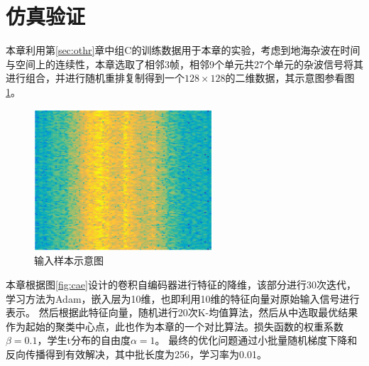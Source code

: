 \section{仿真验证}
\label{sec:decc_experiment}
本章利用第\ref{sec:othr}章中组C的训练数据用于本章的实验，考虑到地海杂波在时间与空间上的连续性，本章选取了相邻3帧，相邻9个单元共27个单元的杂波信号将其进行组合，并进行随机重排复制得到一个$128\times 128$的二维数据，其示意图参看图 \ref{fig:unsurpvised_data}。
\begin{figure}[hbt]
	\centering
	\includegraphics[width=6.67cm]{figures/AE/unsurpvised_data}
	\caption{输入样本示意图}
	\label{fig:unsurpvised_data}
\end{figure}

本章根据图\ref{fig:cae}设计的卷积自编码器进行特征的降维，该部分进行30次迭代，学习方法为Adam，嵌入层为10维，也即利用10维的特征向量对原始输入信号进行表示。
然后根据此特征向量，随机进行20次K-均值算法，然后从中选取最优结果作为起始的聚类中心点，此也作为本章的一个对比算法。损失函数的权重系数$\beta = 0.1$，学生t分布的自由度$\alpha = 1$。
最终的优化问题通过小批量随机梯度下降和反向传播得到有效解决，其中批长度为256，学习率为0.01。


